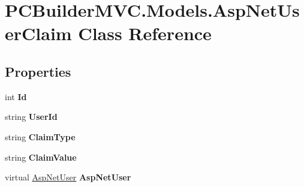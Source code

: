 \hypertarget{class_p_c_builder_m_v_c_1_1_models_1_1_asp_net_user_claim}{}\section{P\+C\+Builder\+M\+V\+C.\+Models.\+Asp\+Net\+User\+Claim Class Reference}
\label{class_p_c_builder_m_v_c_1_1_models_1_1_asp_net_user_claim}
\subsection*{Properties}
\begin{DoxyCompactItemize}
\item 
int {\bfseries Id}\hypertarget{class_p_c_builder_m_v_c_1_1_models_1_1_asp_net_user_claim_abe6064a4d509498a4bff5e0b3004e8fb}{}\label{class_p_c_builder_m_v_c_1_1_models_1_1_asp_net_user_claim_abe6064a4d509498a4bff5e0b3004e8fb}

\item 
string {\bfseries User\+Id}\hypertarget{class_p_c_builder_m_v_c_1_1_models_1_1_asp_net_user_claim_a967797d567964ee4f5835d17afac9087}{}\label{class_p_c_builder_m_v_c_1_1_models_1_1_asp_net_user_claim_a967797d567964ee4f5835d17afac9087}

\item 
string {\bfseries Claim\+Type}\hypertarget{class_p_c_builder_m_v_c_1_1_models_1_1_asp_net_user_claim_afc87beebef4b5a3706aa950e9334312c}{}\label{class_p_c_builder_m_v_c_1_1_models_1_1_asp_net_user_claim_afc87beebef4b5a3706aa950e9334312c}

\item 
string {\bfseries Claim\+Value}\hypertarget{class_p_c_builder_m_v_c_1_1_models_1_1_asp_net_user_claim_a2ddb20d0ae673265de4cfbd8f9d6b6d8}{}\label{class_p_c_builder_m_v_c_1_1_models_1_1_asp_net_user_claim_a2ddb20d0ae673265de4cfbd8f9d6b6d8}

\item 
virtual \hyperlink{class_p_c_builder_m_v_c_1_1_models_1_1_asp_net_user}{Asp\+Net\+User} {\bfseries Asp\+Net\+User}\hypertarget{class_p_c_builder_m_v_c_1_1_models_1_1_asp_net_user_claim_a451f06776aeaf224a70eec4c81e559cf}{}\label{class_p_c_builder_m_v_c_1_1_models_1_1_asp_net_user_claim_a451f06776aeaf224a70eec4c81e559cf}

\end{DoxyCompactItemize}


